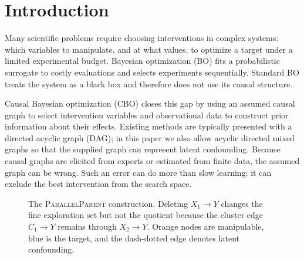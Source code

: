 \documentclass[twoside]{article}
\begin{document}


\begin{abstract}
Ignore the abstract for now

We need to write this, just writing here something so that the figure appears on the right side of the page 

for visual purposes only

right 

right

right

right

right

right

right
\end{abstract}

\section{Introduction}
\label{sec:intro}

Many scientific problems require choosing interventions in complex systems: which variables to manipulate, and at what values, to optimize a target under a limited experimental budget. Bayesian optimization (BO) fits a probabilistic surrogate to costly evaluations and selects experiments sequentially. Standard BO treats the system as a black box and therefore does not use its causal structure.

Causal Bayesian optimization (CBO) \citep{agliettiCausalBayesianOptimization2020b} closes this gap by using an assumed causal graph to select intervention variables and observational data to construct prior information about their effects. Existing methods are typically presented with a directed acyclic graph (DAG); in this paper we also allow acyclic directed mixed graphs so that the supplied graph can represent latent confounding. Because causal graphs are elicited from experts or estimated from finite data, the assumed graph can be wrong. Such an error can do more than slow learning: it can exclude the best intervention from the search space.

\begin{figure}[t]
  \centering
  
  \caption{The \textsc{ParallelParent} construction. Deleting
  $X_1\to Y$ changes the fine exploration set but not the quotient because the cluster edge $C_1\to Y$ remains through $X_2\to Y$. Orange nodes are manipulable, blue is the target, and the dash-dotted edge denotes latent
  confounding.}
  \label{fig:motivating}
\end{figure}
\end{document}
